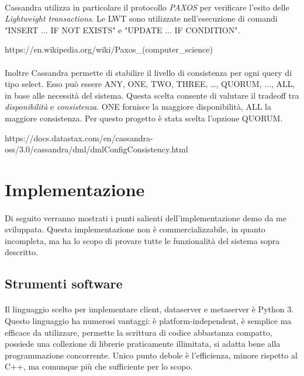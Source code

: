 \documentclass{article}
\begin{document}
\paragraph{} Cassandra utilizza in particolare il protocollo \emph{PAXOS} per verificare l'esito delle \emph{Lightweight transactions}. Le LWT sono utilizzate nell'esecuzione di comandi "INSERT $\dots$ IF NOT EXISTS" e "UPDATE ... IF CONDITION".

https://en.wikipedia.org/wiki/Paxos\_(computer\_science)  

\paragraph{} Inoltre Cassandra permette di stabilire il livello di consistenza per ogni query di tipo select. Esso può essere ANY, ONE, TWO, THREE, \dots, QUORUM, $\dots$, ALL, in base alle necessità del sistema. Questa scelta consente di valutare il tradeoff tra \emph{disponibilità} e \emph{consistenza}. ONE fornisce la maggiore disponibilità, ALL la maggiore consistenza. Per questo progetto è stata scelta l'opzione QUORUM. 

https://docs.datastax.com/en/cassandra-oss/3.0/cassandra/dml/dmlConfigConsistency.html


\section{Implementazione}

\paragraph{} Di seguito verranno mostrati i punti salienti dell'implementazione demo da me sviluppata. Questa implementazione non è commercializzabile, in quanto incompleta, ma ha lo scopo di provare tutte le funzionalità del sistema sopra descritto. 

\subsection{Strumenti software}

\paragraph{} Il linguaggio scelto per implementare client, dataserver e metaserver è Python 3. Questo linguaggio ha numerosi vantaggi: è platform-independent, è semplice ma efficace da utilizzare, permette la scrittura di codice abbastanza compatto, possiede una collezione di librerie praticamente illimitata, si adatta bene alla programmazione concorrente. Unico punto debole è l'efficienza, minore rispetto al C++, ma comunque più che sufficiente per lo scopo. 
\end{document}
